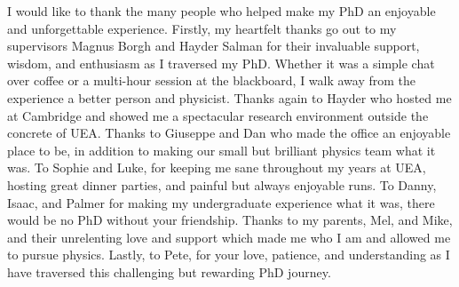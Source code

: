 I would like to thank the many people who helped make my PhD an enjoyable
and unforgettable experience.
Firstly, my heartfelt thanks go out to my supervisors Magnus Borgh and Hayder
Salman for their invaluable support, wisdom, and enthusiasm as I traversed my
PhD.
Whether it was a simple chat over coffee or a multi-hour session at the
blackboard, I walk away from the experience a better person and physicist.
Thanks again to Hayder who hosted me at Cambridge and showed me a spectacular
research environment outside the concrete of UEA\@.
Thanks to Giuseppe and Dan who made the office an enjoyable place to be, in
addition to making our small but brilliant physics team what it was.
To Sophie and Luke, for keeping me sane throughout my years at UEA, hosting
great dinner parties, and painful but always enjoyable runs.
To Danny, Isaac, and Palmer for making my undergraduate experience what it was,
there would be no PhD without your friendship.
Thanks to my parents, Mel, and Mike, and their unrelenting love and support
which made me who I am and allowed me to pursue physics.
Lastly, to Pete, for your love, patience, and understanding as I have traversed
this challenging but rewarding PhD journey.